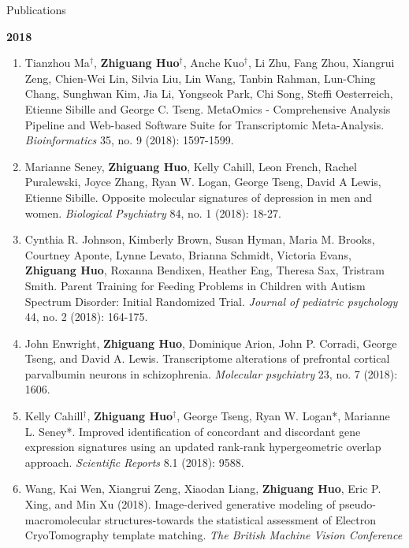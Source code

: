 \documentclass{resume} %
\begin{document}
\begin{rSection}{Publications}
\begin{enumerate}[noitemsep,topsep=0pt,resume]
\end{enumerate}

\textbf{2018}
\begin{enumerate}[noitemsep,topsep=0pt, resume]

\item Tianzhou Ma$^\dagger$, {\bf  Zhiguang Huo$^\dagger$}, Anche Kuo$^\dagger$, Li Zhu, Fang Zhou, Xiangrui Zeng, Chien-Wei Lin, Silvia Liu, Lin Wang, Tanbin Rahman, Lun-Ching Chang, Sunghwan Kim, Jia Li, Yongseok Park, Chi Song, Steffi Oesterreich, Etienne Sibille and George C. Tseng. 
MetaOmics - Comprehensive Analysis Pipeline and Web-based Software Suite for Transcriptomic Meta-Analysis. \emph{Bioinformatics} 35, no. 9 (2018): 1597-1599. 

\item Marianne Seney,  {\bf Zhiguang Huo},  Kelly Cahill, Leon French, Rachel Puralewski, Joyce Zhang, Ryan W. Logan, George Tseng, David A Lewis, Etienne Sibille. Opposite molecular signatures of depression in men and women. \emph{Biological Psychiatry}  84, no. 1 (2018): 18-27.

\item 
Cynthia R. Johnson, Kimberly Brown, Susan Hyman, Maria M. Brooks, Courtney Aponte, Lynne Levato, Brianna Schmidt,
Victoria Evans, {\bf Zhiguang Huo},  Roxanna Bendixen, Heather Eng, Theresa Sax, Tristram Smith.
Parent Training for Feeding Problems in Children with Autism Spectrum Disorder: Initial Randomized Trial. \emph{Journal of pediatric psychology} 44, no. 2 (2018): 164-175.

\item 
John Enwright, {\bf Zhiguang Huo}, Dominique Arion, John P. Corradi, George Tseng, and David A. Lewis. 
Transcriptome alterations of prefrontal cortical parvalbumin neurons in schizophrenia. 
\emph{Molecular psychiatry} 23, no. 7 (2018): 1606.


\item Kelly Cahill$^\dagger$, {\bf  Zhiguang Huo$^\dagger$}, George Tseng, Ryan W. Logan*, Marianne L. Seney*.
Improved identification of concordant and discordant gene expression signatures using an updated rank-rank hypergeometric overlap approach. \emph{Scientific Reports} 8.1 (2018): 9588.

\item 
Wang, Kai Wen, Xiangrui Zeng, Xiaodan Liang, {\bf Zhiguang Huo}, Eric P. Xing, and Min Xu (2018). Image-derived generative modeling of pseudo-macromolecular structures-towards the statistical assessment of Electron CryoTomography template matching. \emph{The British Machine Vision Conference}


\end{enumerate}
\end{rSection}
\end{document}
